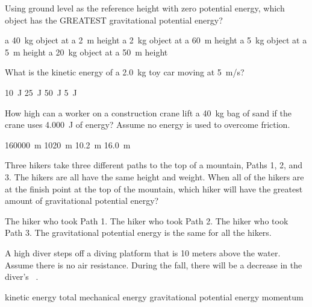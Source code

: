 \documentclass[]{exam}
\begin{document}
\begin{questions}
\question
Using ground level as the reference height with zero potential energy, which object has the GREATEST gravitational potential energy?

\begin{randomizechoices}
\choice a \SI{40}{kg} object at a \SI{2}{m} height
\choice a \SI{2}{kg} object at a \SI{60}{m} height
\choice a \SI{5}{kg} object at a \SI{5}{m} height
\correctchoice a \SI{20}{kg} object at a \SI{50}{m} height
\end{randomizechoices}

\question
What is the kinetic energy of a \SI{2.0}{kg} toy car moving at \SI{5}{m/s}?

\begin{randomizechoices}
\choice \SI{10}{J}
\correctchoice \SI{25}{J}
\choice \SI{50}{J}
\choice \SI{5}{J}
\end{randomizechoices}

\question
How high can a worker on a construction crane lift a \SI{40}{kg} bag of sand if the crane uses \SI{4,000}{J} of energy? Assume no energy is used to overcome friction.

\begin{randomizechoices}
\choice \SI{160000}{m}
\choice \SI{1020}{m}
\correctchoice \SI{10.2}{m}
\choice \SI{16.0}{m}
\end{randomizechoices}

\question
Three hikers take three different paths to the top of a mountain, Paths 1, 2, and 3. The hikers are all have the same height and weight. When all of the hikers are at the finish point at the top of the mountain, which hiker will have the greatest amount of gravitational potential energy?

\begin{randomizechoices}
\choice The hiker who took Path 1. 
\choice The hiker who took Path 2.
\choice The hiker who took Path 3.
\choice The gravitational potential energy is the same for all the hikers.
\end{randomizechoices}

\question
A high diver steps off a diving platform that is 10 meters above the water. Assume there is no air resistance. During the fall, there will be a decrease in the diver's \fillin\ .

\begin{randomizechoices}
\choice kinetic energy
\choice total mechanical energy
\correctchoice gravitational potential energy
\choice momentum
\end{randomizechoices}



\end{questions}
\end{document}
